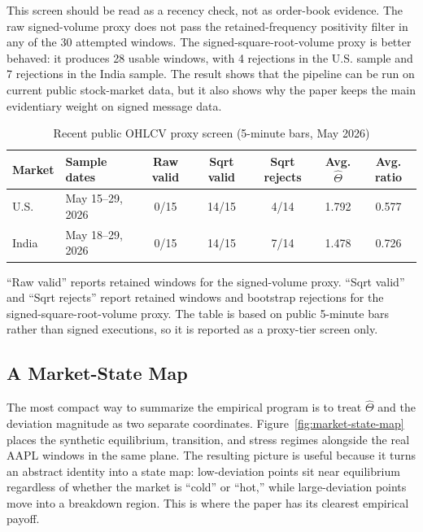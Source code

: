 \documentclass[11pt]{article}
\begin{document}
This screen should be read as a recency check, not as order-book evidence. The raw signed-volume proxy does not pass the retained-frequency positivity filter in any of the 30 attempted windows. The signed-square-root-volume proxy is better behaved: it produces 28 usable windows, with 4 rejections in the U.S. sample and 7 rejections in the India sample. The result shows that the pipeline can be run on current public stock-market data, but it also shows why the paper keeps the main evidentiary weight on signed message data.

\begin{table}[H]
\centering
\caption{Recent public OHLCV proxy screen (5-minute bars, May 2026)}
\small
\begin{tabular}{llccccc}
\toprule
Market & Sample dates & Raw valid & Sqrt valid & Sqrt rejects & Avg. $\widehat{\Theta}$ & Avg. ratio \\
\midrule
U.S. & May 15--29, 2026 & 0/15 & 14/15 & 4/14 & 1.792 & 0.577 \\
India & May 18--29, 2026 & 0/15 & 14/15 & 7/14 & 1.478 & 0.726 \\
\bottomrule
\end{tabular}
\vspace{0.4em}

\parbox{0.94\textwidth}{\footnotesize ``Raw valid'' reports retained windows for the signed-volume proxy. ``Sqrt valid'' and ``Sqrt rejects'' report retained windows and bootstrap rejections for the signed-square-root-volume proxy. The table is based on public 5-minute bars rather than signed executions, so it is reported as a proxy-tier screen only.}
\label{tab:recent-proxy}
\end{table}

\subsection{A Market-State Map}
The most compact way to summarize the empirical program is to treat $\widehat{\Theta}$ and the deviation magnitude as two separate coordinates. Figure~\ref{fig:market-state-map} places the synthetic equilibrium, transition, and stress regimes alongside the real AAPL windows in the same plane. The resulting picture is useful because it turns an abstract identity into a state map: low-deviation points sit near equilibrium regardless of whether the market is ``cold'' or ``hot,'' while large-deviation points move into a breakdown region. This is where the paper has its clearest empirical payoff.
\end{document}
